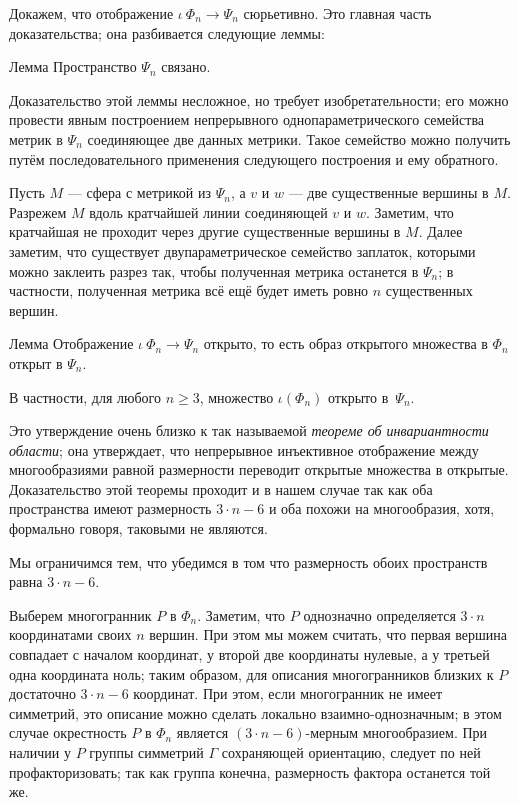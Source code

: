 \documentclass[oneside,a4paper]{article}
\begin{document}
\medskip

 Докажем, что отображение $\iota\:\Phi_n\to\Psi_n$ сюрьетивно.
Это главная часть доказательства; она разбивается следующие леммы:

\begin{thm}{Лемма}
Пространство $\Psi_n$ связано.
\end{thm}

Доказательство этой леммы несложное, но требует изобретательности; 
его можно провести явным построением непрерывного однопараметрического семейства  метрик в $\Psi_n$ соединяющее две данных метрики.
Такое семейство можно получить путём последовательного применения следующего построения и ему обратного.

Пусть $M$ --- сфера с метрикой из $\Psi_n$, а $v$ и $w$ --- две существенные вершины в $M$.
Разрежем $M$ вдоль кратчайшей линии соединяющей $v$ и $w$. 
Заметим, что кратчайшая не проходит через другие существенные вершины в $M$.
Далее заметим, что существует двупараметрическое семейство заплаток, которыми можно заклеить разрез так, чтобы полученная метрика останется в $\Psi_n$; 
в частности, полученная метрика всё ещё будет иметь ровно $n$ существенных вершин.


\begin{thm}{Лемма}
Отображение $\iota\:\Phi_n\to\Psi_n$ открыто, 
то есть образ открытого множества в $\Phi_n$ открыт в $\Psi_n$.

В частности, для любого $n\ge 3$, множество $\iota(\Phi_n)$ открыто в~$\Psi_n$.
\end{thm}

Это утверждение очень близко к так называемой \emph{теореме об инвариантности области};
она утверждает, что непрерывное инъективное отображение между многообразиями равной размерности переводит открытые множества в открытые.
Доказательство этой теоремы проходит и в нашем случае так как оба пространства имеют размерность $3\cdot n-6$ и оба похожи на многообразия, хотя, формально говоря, таковыми не являются.

Мы ограничимся тем, что убедимся в том что размерность обоих пространств равна $3\cdot n-6$.

Выберем многогранник $P$ в $\Phi_n$.
Заметим, что $P$ однозначно определяется $3\cdot n$ координатами своих $n$ вершин.
При этом мы можем считать, что первая вершина совпадает с началом координат, у второй две координаты нулевые, а у третьей одна координата ноль; таким образом, для описания многогранников близких к $P$ достаточно $3\cdot n-6$ координат.
При этом, если многогранник не имеет симметрий, это описание можно сделать локально взаимно-однозначным;
в этом случае окрестность $P$ в $\Phi_n$ является $(3\cdot n-6)$-мерным многообразием.
При наличии у $P$ группы симметрий $\Gamma$ сохраняющей ориентацию, следует по ней профакторизовать;
так как группа конечна, размерность фактора останется той же.
\end{document}
